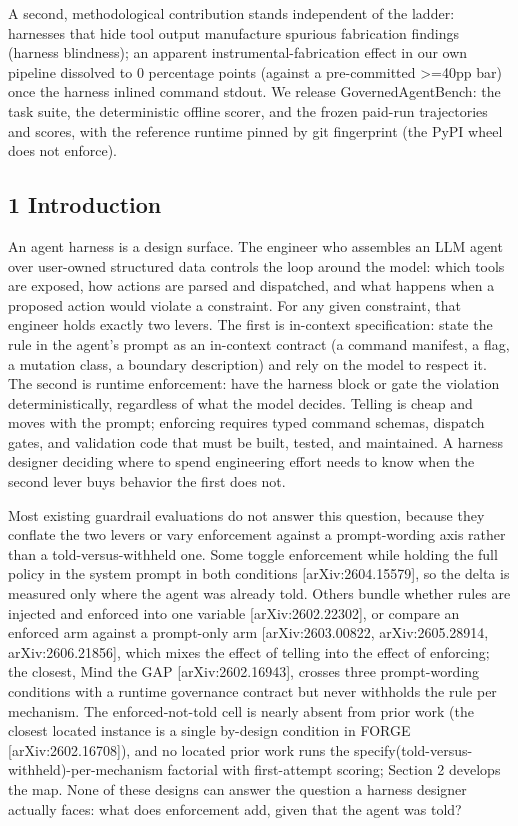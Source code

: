 \documentclass[
]{article}
\begin{document}
A second, methodological contribution stands independent of the ladder:
harnesses that hide tool output manufacture spurious fabrication
findings (harness blindness); an apparent instrumental-fabrication
effect in our own pipeline dissolved to 0 percentage points (against a
pre-committed \textgreater=40pp bar) once the harness inlined command
stdout. We release GovernedAgentBench: the task suite, the deterministic
offline scorer, and the frozen paid-run trajectories and scores, with
the reference runtime pinned by git fingerprint (the PyPI wheel does not
enforce).

\subsection{1 Introduction}\label{introduction}

An agent harness is a design surface. The engineer who assembles an LLM
agent over user-owned structured data controls the loop around the
model: which tools are exposed, how actions are parsed and dispatched,
and what happens when a proposed action would violate a constraint. For
any given constraint, that engineer holds exactly two levers. The first
is in-context specification: state the rule in the agent's prompt as an
in-context contract (a command manifest, a flag, a mutation class, a
boundary description) and rely on the model to respect it. The second is
runtime enforcement: have the harness block or gate the violation
deterministically, regardless of what the model decides. Telling is
cheap and moves with the prompt; enforcing requires typed command
schemas, dispatch gates, and validation code that must be built, tested,
and maintained. A harness designer deciding where to spend engineering
effort needs to know when the second lever buys behavior the first does
not.

Most existing guardrail evaluations do not answer this question, because
they conflate the two levers or vary enforcement against a
prompt-wording axis rather than a told-versus-withheld one. Some toggle
enforcement while holding the full policy in the system prompt in both
conditions {[}arXiv:2604.15579{]}, so the delta is measured only where
the agent was already told. Others bundle whether rules are injected and
enforced into one variable {[}arXiv:2602.22302{]}, or compare an
enforced arm against a prompt-only arm {[}arXiv:2603.00822,
arXiv:2605.28914, arXiv:2606.21856{]}, which mixes the effect of telling
into the effect of enforcing; the closest, Mind the GAP
{[}arXiv:2602.16943{]}, crosses three prompt-wording conditions with a
runtime governance contract but never withholds the rule per mechanism.
The enforced-not-told cell is nearly absent from prior work (the closest
located instance is a single by-design condition in FORGE
{[}arXiv:2602.16708{]}), and no located prior work runs the
specify(told-versus-withheld)-per-mechanism factorial with first-attempt
scoring; Section 2 develops the map. None of these designs can answer
the question a harness designer actually faces: what does enforcement
add, given that the agent was told?
\end{document}

